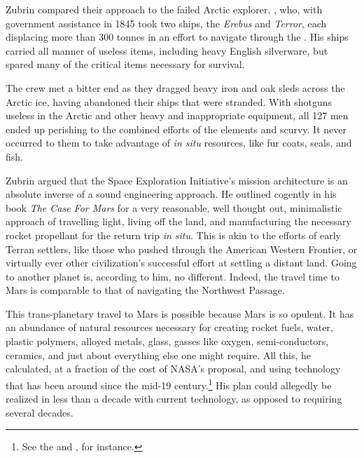 Zubrin compared their approach to the failed Arctic explorer, , who, with government assistance in 1845 took two ships, the {\sl Erebus} and {\sl Terror}, each displacing more than 300 tonnes in an effort to navigate through the . His ships carried all manner of useless items, including heavy English silverware, but spared many of the critical items necessary for survival. 

The crew met a bitter end as they dragged heavy iron and oak sleds across the Arctic ice, having abandoned their ships that were stranded. With shotguns useless in the Arctic and other heavy and inappropriate equipment, all 127 men ended up perishing to the combined efforts of the elements and scurvy. It never occurred to them to take advantage of {\sl in situ} resources, like fur coats, seals, and fish.

Zubrin argued that the Space Exploration Initiative's mission architecture is an absolute inverse of a sound engineering approach. He outlined cogently in his book {\sl The Case For Mars} for a very reasonable, well thought out, minimalistic approach of travelling light, living off the land, and manufacturing the necessary rocket propellant for the return trip {\sl in situ}. This is akin to the efforts of early Terran settlers, like those who pushed through the American Western Frontier, or virtually ever other civilization's successful effort at settling a distant land. Going to another planet is, according to him, no different. Indeed, the travel time to Mars is comparable to that of navigating the Northwest Passage.

This trans-planetary travel to Mars is possible because Mars is so opulent. It has an abundance of natural resources necessary for creating rocket fuels, water, plastic polymers, alloyed metals, glass, gasses like oxygen, semi-conductors, ceramics, and just about everything else one might require. All this, he calculated, at a fraction of the cost of NASA's proposal, and using technology that has been around since the mid-19 century.\footnote{See the  and , for instance.} His plan could allegedly be realized in less than a decade with current technology, as opposed to requiring several decades.


